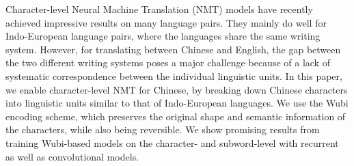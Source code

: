 Character-level Neural Machine Translation (NMT) models have recently achieved impressive results on many language pairs. They mainly do well for Indo-European language pairs, where the languages share the same writing system. However, for translating between Chinese and English, the gap between the two different writing systems poses a major challenge because of a lack of systematic correspondence between the individual linguistic units. In this paper, we enable character-level NMT for Chinese, by breaking down Chinese characters into linguistic units similar to that of Indo-European languages. We use the Wubi encoding scheme, which preserves the original shape and semantic information of the characters, while also being reversible. We show promising results from training Wubi-based models on the character- and subword-level with recurrent as well as convolutional models.
